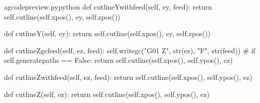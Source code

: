 \documentclass{ltxdoc}
\begin{document}
\begin{writecode}{a}{gcodepreview.py}{python}
    def cutlineYwithfeed(self, ey, feed):
        return self.cutline(self.xpos(), ey, self.zpos())

    def cutlineY(self, ey):
        return self.cutline(self.xpos(), ey, self.zpos())

    def cutlineZgcfeed(self, ez, feed):
        self.writegc("G01 Z", str(ez), "F", str(feed))
#        if self.generatepaths == False:
        return self.cutline(self.xpos(), self.ypos(), ez)

    def cutlineZwithfeed(self, ez, feed):
        return self.cutline(self.xpos(), self.ypos(), ez)

    def cutlineZ(self, ez):
        return self.cutline(self.xpos(), self.ypos(), ez)

\end{writecode}
\addtocounter{gcpy}{107}
\end{document}
